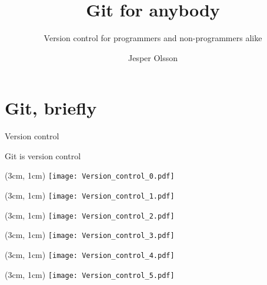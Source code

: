 \documentclass{beamer}
\title{Git for anybody}
\subtitle{Version control for programmers and non-programmers alike}
\author{Jesper Olsson}
\institute{}
\begin{document}
\frame{\titlepage}

\section{Git, briefly}

\begin{frame}{Version control}
    \begin{center}
        \huge Git is version control
    \end{center}
\end{frame}

\begin{frame}
    \begin{textblock*}{\textwidth}(3cm, 1cm)
        \texttt{[image: Version\_control\_0.pdf]}
    \end{textblock*}
\end{frame}

\begin{frame}
    \begin{textblock*}{\textwidth}(3cm, 1cm)
        \texttt{[image: Version\_control\_1.pdf]}
    \end{textblock*}
\end{frame}

\begin{frame}
    \begin{textblock*}{\textwidth}(3cm, 1cm)
        \texttt{[image: Version\_control\_2.pdf]}
    \end{textblock*}
\end{frame}

\begin{frame}
    \begin{textblock*}{\textwidth}(3cm, 1cm)
        \texttt{[image: Version\_control\_3.pdf]}
    \end{textblock*}
\end{frame}

\begin{frame}
    \begin{textblock*}{\textwidth}(3cm, 1cm)
        \texttt{[image: Version\_control\_4.pdf]}
    \end{textblock*}
\end{frame}

\begin{frame}
    \begin{textblock*}{\textwidth}(3cm, 1cm)
        \texttt{[image: Version\_control\_5.pdf]}
    \end{textblock*}
\end{frame}
\end{document}
